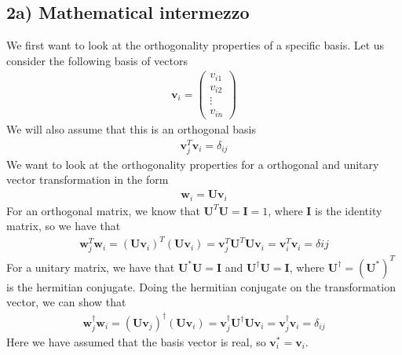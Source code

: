 \documentclass[12pt]{article}
\begin{document}
\subsection*{2a) Mathematical intermezzo}
We first want to look at the orthogonality properties of a specific basis. Let us consider the following basis of vectors
\begin{align}
\mathbf{v}_i = \begin{pmatrix}
v_{i1} \\
v_{i2} \\
\vdots \\
v_{in}
\end{pmatrix}
\end{align}
We will also assume that this is an orthogonal basis
\begin{align}
\mathbf{v}_j^T\mathbf{v}_i = \delta_{ij}
\end{align}
We want to look at the orthogonality properties for a orthogonal and unitary vector transformation in the form
\begin{align}
\mathbf{w}_i = \mathbf{U}\mathbf{v}_i
\end{align}
For an orthogonal matrix, we know that $\mathbf{U}^T\mathbf{U} = \mathbf{I}=1$, where $\mathbf{I}$ is the identity matrix, so we have that
\begin{align}
\mathbf{w}_j^T\mathbf{w}_i = (\mathbf{U}\mathbf{v}_i)^T(\mathbf{U}\mathbf{v}_i) = \mathbf{v}_j^T \mathbf{U}^T\mathbf{U}\mathbf{v}_i = \mathbf{v}_i^T\mathbf{v}_i = \delta{ij}
\end{align}
For a unitary matrix, we have that $\mathbf{U^*}\mathbf{U}=\mathbf{I}$ and $\mathbf{U}^{\dagger}\mathbf{U} = \mathbf{I}$, where $\mathbf{U}^{\dagger} = (\mathbf{U}^*)^T$ is the hermitian conjugate. Doing the hermitian conjugate on the transformation vector, we can show that
\begin{align}
\mathbf{w}_j^{\dagger}\mathbf{w}_i = (\mathbf{U}\mathbf{v}_j)^{\dagger}(\mathbf{U}\mathbf{v}_i) = \mathbf{v}_j^{\dagger}\mathbf{U}^{\dagger}\mathbf{U}\mathbf{v}_i = \mathbf{v}_j^{\dagger}\mathbf{v}_i = \delta_{ij}
\end{align}
Here we have assumed that the basis vector is real, so $\mathbf{v}_i^* = \mathbf{v}_i$.
\end{document}
